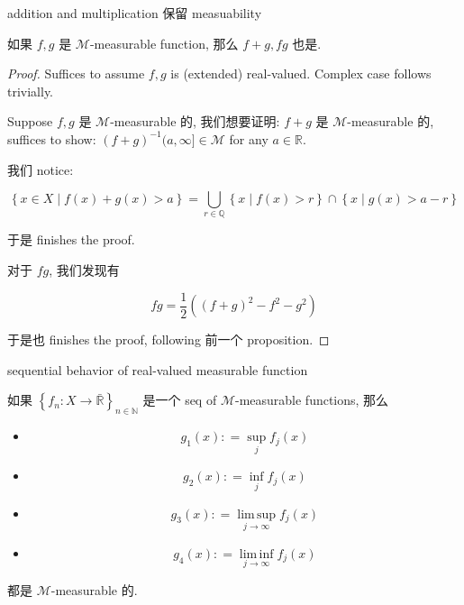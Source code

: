 \documentclass{qlnotes-export}
\begin{document}
\begin{proposition}{addition and multiplication 保留 measuability}\label{prop-04-measurable-functions-and-integration-on-l-mu-addition-and-multiplication-measuability}

如果 \(f,g\) 是 \(\mathcal{M}\)-measurable function, 那么 \(f + g,fg\) 也是.

\end{proposition}

\begin{proof}

Suffices to assume \(f,g\) is (extended) real-valued. Complex case follows trivially.

Suppose \(f,g\) 是 \(\mathcal{M}\)-measurable 的, 我们想要证明: \(f + g\) 是 \(\mathcal{M}\)-measurable 的, suffices to show: \((f + g)^{- 1}(a,\infty\rbrack \in \mathcal{M}\) for any \(a \in {\mathbb{R}}\).

我们 notice:

\[\left\{ {x \in X \mid f(x) + g(x) > a} \right\} = \bigcup\limits_{r \in {\mathbb{Q}}}\left\{ {x \mid f(x) > r} \right\} \cap \left\{ {x \mid g(x) > a - r} \right\}\]

于是 finishes the proof.

对于 \(fg\), 我们发现有

\[fg = \frac{1}{2}((f + g)^{2} - f^{2} - g^{2})\]

于是也 finishes the proof, following 前一个 proposition.

\end{proof}

\begin{lemma}{sequential behavior of real-valued measurable function}\label{lem-04-measurable-functions-and-integration-on-l-mu-sequential-behavior-of-real-valued-measurable-function}

如果 \(\left\{ {f_{n}:X\rightarrow\bar{\mathbb{R}}} \right\}_{n \in {\mathbb{N}}}\) 是一个 seq of \(\mathcal{M}\)-measurable functions, 那么

\begin{itemize}
\tightlist
\item
  \[g_{1}(x): = \sup\limits_{j}f_{j}(x)\]
\item
  \[g_{2}(x): = \inf\limits_{j}f_{j}(x)\]
\item
  \[g_{3}(x): = \operatorname{lim\, sup}\limits_{j\rightarrow\infty}f_{j}(x)\]
\item
  \[g_{4}(x): = \operatorname{lim\, inf}\limits_{j\rightarrow\infty}f_{j}(x)\]
\end{itemize}

都是 \(\mathcal{M}\)-measurable 的.

\end{lemma}
\end{document}

